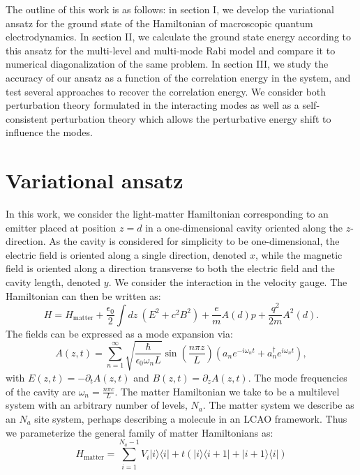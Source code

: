 \documentclass[aps,prb,twocolumn,
	groupedaddress,superscriptaddress,
	amsfonts,amssymb,amsmath,floatfix,
	citeautoscript]{revtex4-1}
\begin{document}
The outline of this work is as follows: in section I, we develop the variational ansatz for the ground state of the Hamiltonian of macroscopic quantum electrodynamics. In section II, we calculate the ground state energy according to this ansatz for the multi-level and multi-mode Rabi model and compare it to numerical diagonalization of the same problem. In section III, we study the accuracy of our ansatz as a function of the correlation energy in the system, and test several approaches to recover the correlation energy.  We consider both perturbation theory formulated in the interacting modes as well as a self-consistent perturbation theory which allows the perturbative energy shift to influence the modes.

\section{Variational ansatz}

In this work, we consider the light-matter Hamiltonian corresponding to an emitter placed at position $z=d$ in a one-dimensional cavity oriented along the $z$-direction. As the cavity is considered for simplicity to be one-dimensional, the electric field is oriented along a single direction, denoted $x$, while the magnetic field is oriented along a direction transverse to both the electric field and the cavity length, denoted $y$. We consider the interaction in the velocity gauge. The Hamiltonian can then be written as:
\begin{equation}
H = H_{\text{matter}}+\frac{\epsilon_0}{2}\int dz~(E^2+c^2B^2)+\frac{e}{m}A(d)p + \frac{q^2}{2m}A^2(d).
\end{equation}
The fields can be expressed as a mode expansion via:
\begin{equation}
A(z,t) = \sum\limits_{n=1}^{\infty} \sqrt{\frac{\hbar}{\epsilon_0\omega_n L}}\sin\left(\frac{n\pi z}{L}\right)(a_ne^{-i\omega_n t}+a_n^{\dagger}e^{i\omega_n t}),
\end{equation}
with $E(z,t) = -\partial_t A(z,t)$ and $B(z,t)=\partial_z A(z,t)$. The mode frequencies of the cavity are $\omega_n = \frac{n\pi c}{L}$. The matter Hamiltonian we take to be a multilevel system with an arbitrary number of levels, $N_a$. The matter system we describe as an $N_a$ site system, perhaps describing a molecule in an LCAO framework. Thus we parameterize the general family of matter Hamiltonians as:
\begin{equation}
H_{\text{matter}} = \sum\limits_{i=1}^{{N_a-1}} V_i|i\rangle\langle i|+t(|i\rangle\langle i+1|+|i+1\rangle\langle i|) 
\end{equation}
\end{document}
